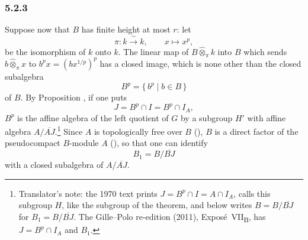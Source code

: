 
\subsubsection*{5.2.3}
\label{sga3:VIIB:5.2.3}

Suppose now that \(B\) has finite height at most \(r\): let
\[
  \pi:k\xrightarrow{\ \sim\ }k,
  \qquad
  x\longmapsto x^p,
\]
be the isomorphism of \(k\) onto \(k\). The linear map of
\(B\widehat\otimes_{\pi}k\) into \(B\) which sends
\(b\widehat\otimes_{\pi}x\) to \(b^px=(bx^{1/p})^p\) has a closed image,
which is none other than the closed subalgebra
\[
  B^p=\{\,b^p\mid b\in B\,\}
\]
of \(B\). By Proposition , if one puts
\[
  J=B^p\cap I=B^p\cap I_A,
\]
\(B^p\) is the affine algebra of the left quotient of \(G\) by a
subgroup \(H'\) with affine algebra \(A/\overline{AJ}\).\footnote{Translator's note: the 1970
text prints \(J=B^p\cap I=A\cap I_A\), calls this subgroup \(H\), like the subgroup of the theorem, and below
writes \(B=B/\overline{BJ}\) for \(B_1=B/\overline{BJ}\). The Gille--Polo re-edition (2011),
Expos\'e~VII\textsubscript{B}, has \(J=B^p\cap I_A\) and \(B_1\).} Since \(A\) is
topologically free over \(B\) \textup{()}, \(B\) is a direct factor
of the pseudocompact \(B\)-module \(A\) \textup{()}, so that one can
identify
\[
  B_1=B/\overline{BJ}
\]
with a closed subalgebra of \(A/\overline{AJ}\).

